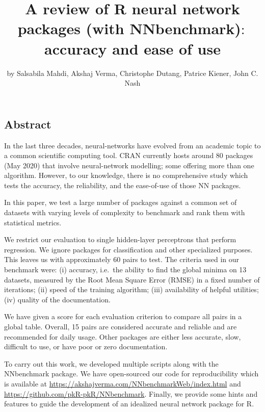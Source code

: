 \title{A review of R neural network packages (with NNbenchmark)\(:\)
accuracy and ease of use}
\author{by Salsabila Mahdi, Akshaj Verma, Christophe Dutang, Patrice
Kiener, John C. Nash}

\maketitle


\hypertarget{abstract}{%
\subsection{Abstract}\label{abstract}}

In the last three decades, neural-networks have evolved from an academic
topic to a common scientific computing tool. CRAN currently hosts around
80 packages (May 2020) that involve neural-network modelling; some
offering more than one algorithm. However, to our knowledge, there is no
comprehensive study which tests the accuracy, the reliability, and the
ease-of-use of those NN packages.

In this paper, we test a large number of packages against a common set
of datasets with varying levels of complexity to benchmark and rank them
with statistical metrics.

We restrict our evaluation to single hidden-layer perceptrons that
perform regression. We ignore packages for classification and other
specialized purposes. This leaves us with approximately 60
 pairs to test. The criteria used in our
benchmark were: (i) accuracy, i.e.~the ability to find the global minima
on 13 datasets, measured by the Root Mean Square Error (RMSE) in a fixed
number of iterations; (ii) speed of the training algorithm; (iii)
availability of helpful utilities; (iv) quality of the documentation.

We have given a score for each evaluation criterion to compare all
 pairs in a global table. Overall, 15 pairs are
considered accurate and reliable and are recommended for daily usage.
Other packages are either less accurate, slow, difficult to use, or have
poor or zero documentation.

To carry out this work, we developed multiple scripts along with the
NNbenchmark package. We have open-sourced our code for reproducibility
which is available at
\url{https://akshajverma.com/NNbenchmarkWeb/index.html} and
\url{https://github.com/pkR-pkR/NNbenchmark}. Finally, we provide some
hints and features to guide the development of an idealized neural
network package for R.


